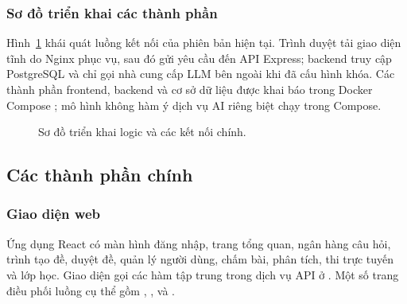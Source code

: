 \subsubsection{Sơ đồ triển khai các thành phần}
Hình~\ref{fig:deployment} khái quát luồng kết nối của phiên bản hiện tại.
Trình duyệt tải giao diện tĩnh do Nginx phục vụ, sau đó gửi yêu cầu đến API
Express; backend truy cập PostgreSQL và chỉ gọi nhà cung cấp LLM bên ngoài
khi đã cấu hình khóa. Các thành phần frontend, backend và cơ sở dữ liệu được
khai báo trong Docker Compose \cite{DockerComposeDocs}; mô hình không hàm ý
dịch vụ AI riêng biệt chạy trong Compose.
\begin{figure}[H]
\centering
{}
\caption{Sơ đồ triển khai logic và các kết nối chính.}
\label{fig:deployment}
\end{figure}

\subsection{Các thành phần chính}

\subsubsection{Giao diện web}
Ứng dụng React có màn hình đăng nhập, trang tổng quan, ngân hàng câu hỏi,
trình tạo đề, duyệt đề, quản lý người dùng, chấm bài, phân tích, thi trực
tuyến và lớp học. Giao diện gọi các hàm tập trung trong dịch vụ API ở
. Một số trang điều phối luồng cụ thể
gồm , ,
 và .

